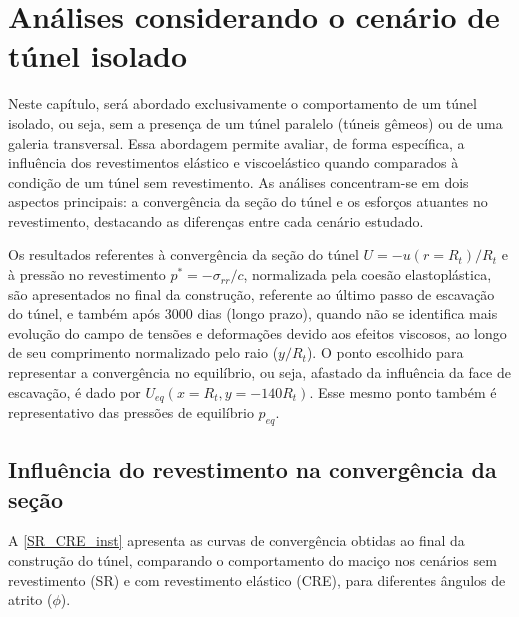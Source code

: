 %
%
%
%
\chapter{Análises considerando o cenário de túnel isolado}

Neste capítulo, será abordado exclusivamente o comportamento de um túnel isolado, ou seja, sem a presença de um túnel paralelo (túneis gêmeos) ou de uma galeria transversal. Essa abordagem permite avaliar, de forma específica, a influência dos revestimentos elástico e viscoelástico quando comparados à condição de um túnel sem revestimento. As análises concentram-se em dois aspectos principais: a convergência da seção do túnel e os esforços atuantes no revestimento, destacando as diferenças entre cada cenário estudado.

Os resultados referentes à convergência da seção do túnel $U=-u(r=R_t)/R_t$ e à pressão no revestimento $p^{\ast}=-\sigma_{rr}/c$, normalizada pela coesão elastoplástica, são apresentados no final da construção, referente ao último passo de escavação do túnel, e também após 3000 dias (longo prazo), quando não se identifica mais evolução do campo de tensões e deformações devido aos efeitos viscosos, ao longo de seu comprimento normalizado pelo raio ($y/R_t$). O ponto escolhido para representar a convergência no equilíbrio, ou seja, afastado da influência da face de escavação, é dado por $U_{eq}(x=R_t,y=-140R_t)$. Esse mesmo ponto também é representativo das pressões de equilíbrio $p_{eq}$.


\section{Influência do revestimento na convergência da seção}

A \autoref{SR_CRE_inst} apresenta as curvas de convergência obtidas ao final da construção do túnel, comparando o comportamento do maciço nos cenários sem revestimento (SR) e com revestimento elástico (CRE), para diferentes ângulos de atrito ($\phi$).

